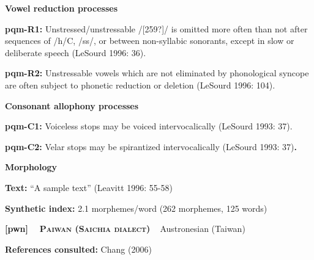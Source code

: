 \begin{styleBody}
\textbf{Vowel reduction processes}
\end{styleBody}

\begin{styleBody}
\textbf{pqm-R1:} Unstressed/unstressable /[259?]/ is omitted more often than not after sequences of /h/C, /ss/, or between non-syllabic sonorants, except in slow or deliberate speech (LeSourd 1996: 36).
\end{styleBody}

\begin{styleBody}
\textbf{pqm-R2: }Unstressable vowels which are not eliminated by phonological syncope are often subject to phonetic reduction or deletion (LeSourd 1996: 104).
\end{styleBody}

\begin{styleBody}
\textbf{Consonant allophony processes}
\end{styleBody}

\begin{styleBody}
\textbf{pqm-C1: }Voiceless stops may be voiced intervocalically (LeSourd 1993: 37).
\end{styleBody}

\begin{styleBody}
\textbf{pqm-C2: }Velar stops may be spirantized intervocalically (LeSourd 1993: 37)\textbf{.}
\end{styleBody}

\begin{styleBody}
\textbf{Morphology}
\end{styleBody}

\begin{styleBody}
\textbf{Text:} “A sample text” (Leavitt 1996: 55-58)
\end{styleBody}

\begin{styleBody}
\textbf{Synthetic index: }2.1 morphemes/word (262 morphemes, 125 words)
\end{styleBody}

\clearpage\begin{styleBody}
\textbf{[pwn] }\ \ \textbf{\textsc{Paiwan (Saichia dialect)}}\textbf{\ \ }Austronesian (Taiwan)
\end{styleBody}

\begin{styleBody}
\textbf{References consulted: }Chang (2006)
\end{styleBody}

